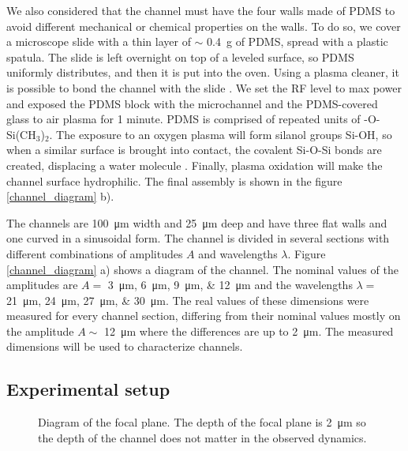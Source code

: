 We also considered that the channel must have the four walls made of PDMS to avoid different mechanical or chemical properties on the walls. To do so, we cover a microscope slide with a thin layer of $\sim$ \SI{0.4}{\gram} of PDMS, spread with a plastic spatula. The slide is left overnight on top of a leveled surface, so PDMS uniformly distributes, and then it is put into the oven. Using a plasma cleaner, it is possible to bond the channel with the slide \cite{Henry2015ScholarlyCommonsProtocol-Technics}. We set the RF level to max power and exposed the PDMS block with the microchannel and the PDMS-covered glass to air plasma for 1 minute. PDMS is comprised of repeated units of -O-Si(CH$_3$)$_2$. The exposure to an oxygen plasma will form silanol groups Si-OH, so when a similar surface is brought into contact, the covalent Si-O-Si bonds are created, displacing a water molecule \cite{Koh2012QuantitativeEffect}. Finally, plasma oxidation will make the channel surface hydrophilic. The final assembly is shown in the figure \ref{channel_diagram} b).

The channels are \SI{100}{\micro\meter} width and \SI{25}{\micro\meter} deep and have three flat walls and one curved in a sinusoidal form. The channel is divided in several sections with different combinations of amplitudes $A$ and wavelengths $\lambda$. Figure \ref{channel_diagram} a) shows a diagram of the channel. The nominal values of the amplitudes are  $A=$ \SIlist[list-units=single, list-final-separator = {, }]{3;6;9;12}{\micro\meter} and the wavelengths $\lambda=$ \SIlist[list-units=single, list-final-separator = {, }]{21;24;27;30}{\micro\meter}. The real values of these dimensions were measured for every channel section, differing from their nominal values mostly on the amplitude $A\sim$ \SI{12}{\micro\meter} where the differences are up to \SI{2}{\micro\meter}. The measured dimensions will be used to characterize channels. 


\subsection{Experimental setup}

\begin{figure}
\centering

\caption[Focal plane diagram]{Diagram of the focal plane. The depth of the focal plane is \SI{2}{\micro\meter} so the depth of the channel does not matter in the observed dynamics. }
\label{focal_plane}
\end{figure}

